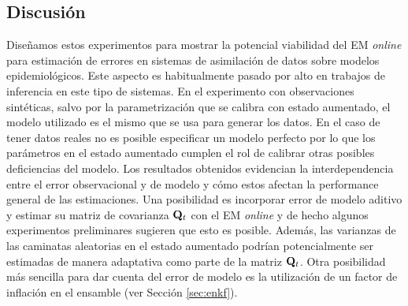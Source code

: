\subsection{Discusión}

Diseñamos estos experimentos para mostrar la potencial viabilidad del EM \textit{online} para estimación de errores en sistemas de asimilación de datos sobre modelos epidemiológicos. Este aspecto es habitualmente pasado por alto en trabajos de inferencia en este tipo de sistemas. En el experimento con observaciones sintéticas, salvo por la parametrización que se calibra con estado aumentado, el modelo utilizado es el mismo que se usa para generar los datos. En el caso de tener datos reales no es posible especificar un modelo perfecto por lo que los parámetros en el estado aumentado cumplen el rol de calibrar otras posibles deficiencias del modelo. Los resultados obtenidos evidencian la interdependencia entre el error observacional y de modelo y cómo estos afectan la performance general de las estimaciones. Una posibilidad es incorporar error de modelo aditivo y estimar su matriz de covarianza $\mathbf{Q}_t$ con el EM \textit{online} y de hecho algunos experimentos preliminares sugieren que esto es posible. Además, las varianzas de las caminatas aleatorias en el estado aumentado podrían potencialmente ser estimadas de manera adaptativa como parte de la matriz $\mathbf{Q}_t$. Otra posibilidad más sencilla para dar cuenta del error de modelo es la utilización de un factor de inflación en el ensamble (ver Sección \ref{sec:enkf}).
